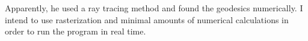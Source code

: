 Apparently, he used a ray tracing method and found the geodesics numerically. I intend to use rasterization and minimal amounts of numerical calculations in order to run the program in real time.




